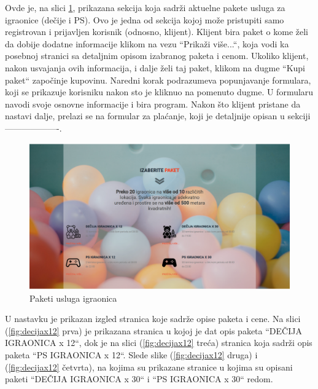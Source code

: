 \documentclass[../main.tex]{subfiles}
\begin{document}
Ovde je, na slici \ref{fig:igraonice}, prikazana sekcija koja sadrži aktuelne pakete usluga za igraonice (dečije i PS). Ovo je jedna od sekcija kojoj može pristupiti samo registrovan i prijavljen korisnik (odnosno, klijent). Klijent bira paket o kome želi da dobije dodatne informacije klikom na vezu ``Prikaži više...``, koja vodi ka posebnoj stranici sa detaljnim opisom izabranog paketa i cenom. Ukoliko klijent, nakon usvajanja ovih informacija, i dalje želi taj paket, klikom na dugme ``Kupi paket`` započinje kupovinu. Naredni korak podrazumeva popunjavanje formulara, koji se prikazuje korisniku nakon sto je kliknuo na pomenuto dugme. U formularu navodi svoje osnovne informacije i bira program. Nakon što klijent pristane da nastavi dalje, prelazi se na formular za plaćanje, koji je detaljnije opisan u sekciji-------------------.

\begin{figure}[!ht]
\begin{center}
\includegraphics[scale=0.22]{sections/korisnicki_interfejs/screenshots/ponude_igraonice.png}
\end{center}
\caption{Paketi usluga igraonica}
\label{fig:igraonice}
\end{figure}

U nastavku je prikazan izgled stranica koje sadrže opise paketa i cene. Na slici (\ref{fig:decijax12} prva) je prikazana stranica u kojoj je dat opis paketa ``DEČIJA IGRAONICA x 12``, dok je na slici (\ref{fig:decijax12} treća) stranica koja sadrži opis paketa ``PS IGRAONICA x 12``. Slede slike (\ref{fig:decijax12} druga) i (\ref{fig:decijax12} četvrta), na kojima su prikazane stranice u kojima su opisani paketi ``DEČIJA IGRAONICA x 30`` i ``PS IGRAONICA x 30`` redom.
\end{document}
